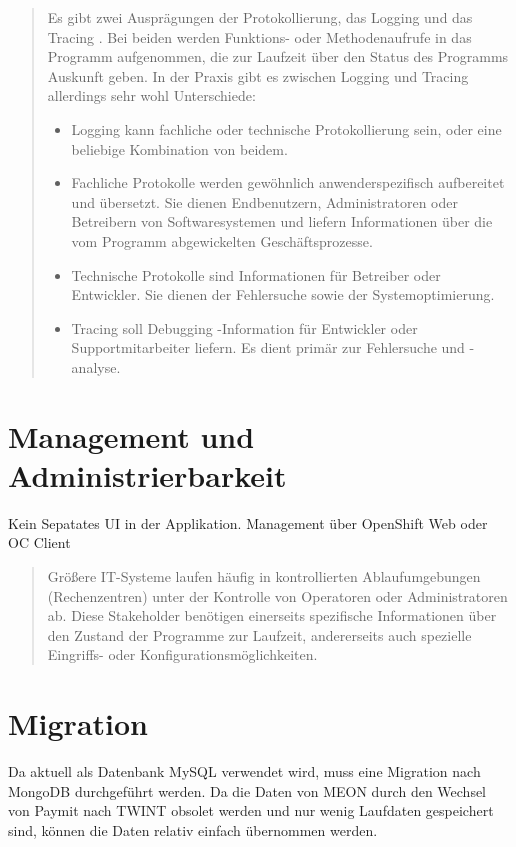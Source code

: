 \begin{quote}
	
	Es gibt zwei Ausprägungen der Protokollierung, das Logging und das Tracing . Bei beiden werden Funktions- oder Methodenaufrufe in das Programm aufgenommen, die zur Laufzeit über den Status des Programms Auskunft geben.
	In der Praxis gibt es zwischen Logging und Tracing allerdings sehr wohl Unterschiede:
	\begin{itemize}
		\item Logging kann fachliche oder technische Protokollierung sein, oder eine beliebige Kombination von beidem.
		\item Fachliche Protokolle werden gewöhnlich anwenderspezifisch aufbereitet und übersetzt. Sie dienen Endbenutzern, Administratoren oder Betreibern von Softwaresystemen und liefern Informationen über die vom Programm abgewickelten Geschäftsprozesse.
		\item Technische Protokolle sind Informationen für Betreiber oder Entwickler. Sie dienen der Fehlersuche sowie der Systemoptimierung.
		\item Tracing soll Debugging -Information für Entwickler oder Supportmitarbeiter liefern. Es dient primär zur Fehlersuche und -analyse.
	\end{itemize}
\end{quote}

\section{Management und Administrierbarkeit}

Kein Sepatates UI in der Applikation. Management über OpenShift Web oder OC Client

\begin{quote}
	Größere IT-Systeme laufen häufig in kontrollierten Ablaufumgebungen (Rechenzentren) unter der Kontrolle von Operatoren oder Administratoren ab. Diese Stakeholder benötigen einerseits spezifische Informationen über den Zustand der Programme zur Laufzeit, andererseits auch spezielle Eingriffs- oder Konfigurationsmöglichkeiten.
\end{quote}

\section{Migration}

Da aktuell als Datenbank MySQL verwendet wird, muss eine Migration nach MongoDB durchgeführt werden. Da die Daten von MEON durch den Wechsel von Paymit nach TWINT
obsolet werden und nur wenig Laufdaten gespeichert sind, können die Daten relativ einfach übernommen werden.

